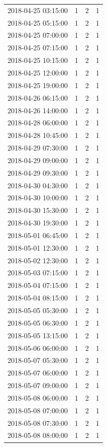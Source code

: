 \begin{tabular}{lrrr}
2018-04-25 03:15:00 & 1 & 2 & 1 \\
2018-04-25 05:15:00 & 1 & 2 & 1 \\
2018-04-25 07:00:00 & 1 & 2 & 1 \\
2018-04-25 07:15:00 & 1 & 2 & 1 \\
2018-04-25 10:15:00 & 1 & 2 & 1 \\
2018-04-25 12:00:00 & 1 & 2 & 1 \\
2018-04-25 19:00:00 & 1 & 2 & 1 \\
2018-04-26 06:15:00 & 1 & 2 & 1 \\
2018-04-26 14:00:00 & 1 & 2 & 1 \\
2018-04-28 06:00:00 & 1 & 2 & 1 \\
2018-04-28 10:45:00 & 1 & 2 & 1 \\
2018-04-29 07:30:00 & 1 & 2 & 1 \\
2018-04-29 09:00:00 & 1 & 2 & 1 \\
2018-04-29 09:30:00 & 1 & 2 & 1 \\
2018-04-30 04:30:00 & 1 & 2 & 1 \\
2018-04-30 10:00:00 & 1 & 2 & 1 \\
2018-04-30 15:30:00 & 1 & 2 & 1 \\
2018-04-30 19:30:00 & 1 & 2 & 1 \\
2018-05-01 06:45:00 & 1 & 2 & 1 \\
2018-05-01 12:30:00 & 1 & 2 & 1 \\
2018-05-02 12:30:00 & 1 & 2 & 1 \\
2018-05-03 07:15:00 & 1 & 2 & 1 \\
2018-05-04 07:15:00 & 1 & 2 & 1 \\
2018-05-04 08:15:00 & 1 & 2 & 1 \\
2018-05-05 05:30:00 & 1 & 2 & 1 \\
2018-05-05 06:30:00 & 1 & 2 & 1 \\
2018-05-05 13:15:00 & 1 & 2 & 1 \\
2018-05-06 06:00:00 & 1 & 2 & 1 \\
2018-05-07 05:30:00 & 1 & 2 & 1 \\
2018-05-07 06:00:00 & 1 & 2 & 1 \\
2018-05-07 09:00:00 & 1 & 2 & 1 \\
2018-05-08 06:00:00 & 1 & 2 & 1 \\
2018-05-08 07:00:00 & 1 & 2 & 1 \\
2018-05-08 07:30:00 & 1 & 2 & 1 \\
2018-05-08 08:00:00 & 1 & 2 & 1 \\

\end{tabular}
